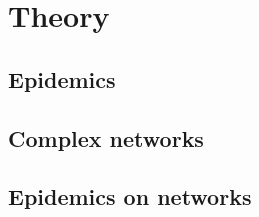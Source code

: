 \chapter{Theory}

\section{Epidemics}


\section{Complex networks}



\section{Epidemics on networks}


